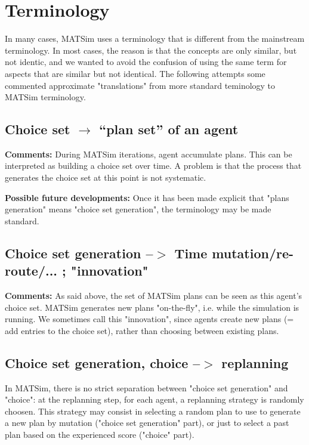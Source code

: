 \chapter{Terminology}

In  many cases, MATSim uses a terminology that is different from the  mainstream terminology. In most cases, the reason is that the  concepts are only similar, but not identic, and we wanted to avoid the  confusion of using the same term for aspects that are similar but not  identical. The following attempts some commented approximate  "translations" from more standard teminology to MATSim terminology.

\vfill\eject
\section{Choice set $\to$ ``plan set'' of an agent}

\textbf{Comments:} During MATSim iterations, agent accumulate   plans. This can be  interpreted as building a choice set over  time. A  problem is that the  process that generates the choice  set at this  point is not systematic.

\textbf{Possible future developments:} Once it has been made explicit that "plans generation" means "choice set generation", the terminology may be made standard.

\vfill\eject
\section{Choice set generation --$>$ Time mutation/re-route/... ; "innovation"}

\textbf{Comments:} As said above, the set of MATSim plans can   be seen as this agent's choice set. MATSim generates new plans   "on-the-fly", i.e. while the simulation is running. We sometimes  call  this "innovation", since agents create new plans (= add entries to  the  choice set), rather than choosing between existing plans.

\vfill\eject
\section{Choice set generation, choice --$>$ replanning}

In MATSim, there is no strict separation between "choice set  generation" and "choice": at the replanning step, for each agent, a  replanning strategy is randomly choosen. This strategy may consist in  selecting a random plan to use to generate a new plan by mutation  ("choice set generation" part), or just to select a past plan based on  the experienced score ("choice" part).


